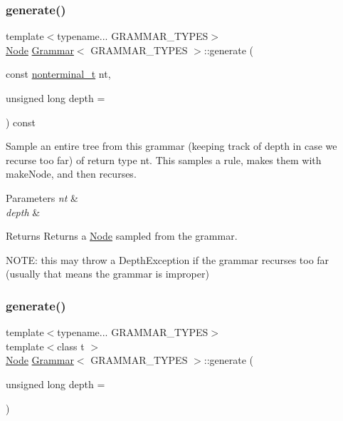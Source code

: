\mbox{\label{class_grammar_af5dee7ec88bdd66edd023b3c935d2765}} 
\subsubsection{\texorpdfstring{generate()}{generate()}\hspace{0.1cm}{\footnotesize\ttfamily [1/2]}}
{\footnotesize\ttfamily template$<$typename... G\+R\+A\+M\+M\+A\+R\+\_\+\+T\+Y\+P\+ES$>$ \\
\hyperlink{class_node}{Node} \hyperlink{class_grammar}{Grammar}$<$ G\+R\+A\+M\+M\+A\+R\+\_\+\+T\+Y\+P\+ES $>$\+::generate (\begin{DoxyParamCaption}\item[{const \hyperlink{_nonterminal_8h_a5c1f658dc7560600a16d22408bd716ca}{nonterminal\+\_\+t}}]{nt,  }\item[{unsigned long}]{depth = {} }\end{DoxyParamCaption}) const\hspace{0.3cm}{\ttfamily [inline]}}

Sample an entire tree from this grammar (keeping track of depth in case we recurse too far) of return type nt. This samples a rule, makes them with make\+Node, and then recurses. 
\begin{DoxyParams}{Parameters}
{\em nt} & \\
\hline
{\em depth} & \\
\hline
\end{DoxyParams}
\begin{DoxyReturn}{Returns}
Returns a \hyperlink{class_node}{Node} sampled from the grammar.
\end{DoxyReturn}
N\+O\+TE\+: this may throw a Depth\+Exception if the grammar recurses too far (usually that means the grammar is improper)\mbox{\label{class_grammar_a01bf556e22bfdd5ec87868869fd9330f}} 
\subsubsection{\texorpdfstring{generate()}{generate()}\hspace{0.1cm}{\footnotesize\ttfamily [2/2]}}
{\footnotesize\ttfamily template$<$typename... G\+R\+A\+M\+M\+A\+R\+\_\+\+T\+Y\+P\+ES$>$ \\
template$<$class t $>$ \\
\hyperlink{class_node}{Node} \hyperlink{class_grammar}{Grammar}$<$ G\+R\+A\+M\+M\+A\+R\+\_\+\+T\+Y\+P\+ES $>$\+::generate (\begin{DoxyParamCaption}\item[{unsigned long}]{depth = {} }\end{DoxyParamCaption})\hspace{0.3cm}{\ttfamily [inline]}}

